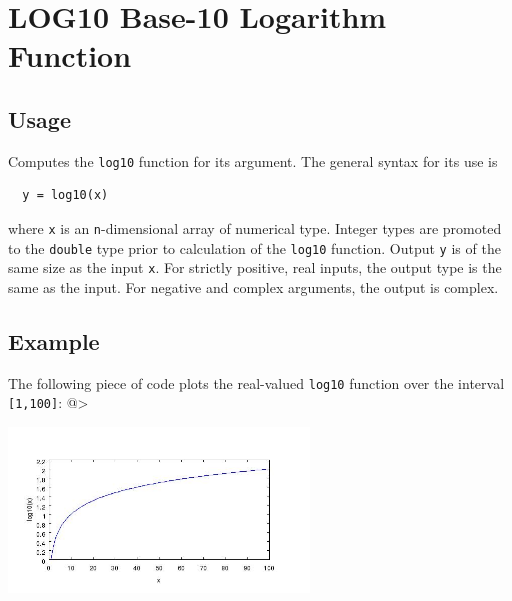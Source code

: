 \section{LOG10 Base-10 Logarithm Function}

\subsection{Usage}

Computes the \verb|log10| function for its argument.  The general
syntax for its use is
\begin{verbatim}
  y = log10(x)
\end{verbatim}
where \verb|x| is an \verb|n|-dimensional array of numerical type.
Integer types are promoted to the \verb|double| type prior to
calculation of the \verb|log10| function.  Output \verb|y| is of the
same size as the input \verb|x|. For strictly positive, real inputs, 
the output type is the same as the input.
For negative and complex arguments, the output is complex.
\subsection{Example}

The following piece of code plots the real-valued \verb|log10|
function over the interval \verb|[1,100]|:
@>


\centerline{\includegraphics[width=8cm]{log10plot}}

